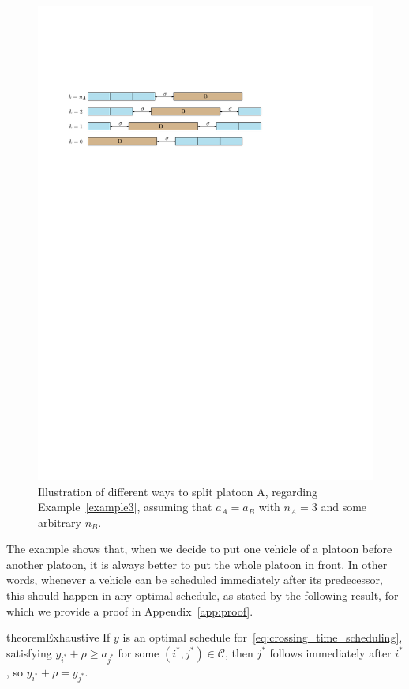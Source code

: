 \documentclass[a4paper]{report}
\theoremstyle{definition}
\theoremstyle{plain}
\begin{document}
\begin{figure}
  \centering
  \includegraphics[scale=1]{figures/single/platoons.pdf}
  \caption{Illustration of different ways to split platoon A, regarding
    Example~\ref{example3}, assuming that $a_{A} = a_{B}$ with $n_{A} = 3$ and
    some arbitrary $n_{B}$.}
  \label{fig:example3}
\end{figure}

The example shows that, when we decide to put one vehicle of a platoon before
another platoon, it is always better to put the whole platoon in front. In other
words, whenever a vehicle can be scheduled immediately after its predecessor,
this should happen in any optimal schedule, as stated by the following result,
for which we provide a proof in Appendix~\ref{app:proof}.

\begin{restatable}{theorem}{Exhaustive}\label{prop:exhaustive}
  If $y$ is an optimal schedule for~\eqref{eq:crossing_time_scheduling},
  satisfying $y_{i^{*}} + \rho \geq a_{j^{*}}$ for some $(i^{*},j^{*}) \in \mathcal{C}$, then $j^{*}$
  follows immediately after $i^{*}$, so $y_{i^{*}} + \rho = y_{j^{*}}$.
\end{restatable}
\end{document}
